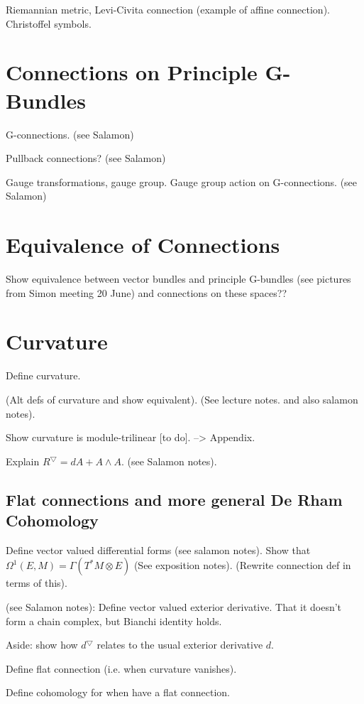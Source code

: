 \documentclass[a4paper]{article}
\theoremstyle{definition} \newtheorem*{definition}{Definition}
\theoremstyle{definition} \newtheorem*{definitions}{Definitions}
\theoremstyle{plain} \newtheorem{theorem}{Theorem}[section]
\theoremstyle{plain} \newtheorem{proposition}[theorem]{Proposition}
\theoremstyle{plain} \newtheorem{corollary}[theorem]{Corollary}
\theoremstyle{plain} \newtheorem{lemma}[theorem]{Lemma}
\theoremstyle{plain} \newtheorem{example}[theorem]{Example}
\begin{document}
Riemannian metric, Levi-Civita connection (example of affine connection). Christoffel symbols.

\section{Connections on Principle G-Bundles}

G-connections. (see Salamon)

Pullback connections? (see Salamon)

Gauge transformations, gauge group. Gauge group action on G-connections. (see Salamon)

\section{Equivalence of Connections}
Show equivalence between vector bundles and principle G-bundles (see pictures from Simon meeting 20 June)
and connections on these spaces??

\section{Curvature}

Define curvature. 

(Alt defs of curvature and show equivalent). (See  lecture notes. and also salamon notes).

Show curvature is module-trilinear [to do]. --> Appendix.

Explain $R^\bigtriangledown = dA + A\wedge A$. (see Salamon notes).

\subsection{Flat connections and more general De Rham Cohomology}

Define vector valued differential forms (see salamon notes). 
Show that $\Omega^1 (E, M) = \Gamma (T^*M\otimes E)$ (See exposition notes). 
(Rewrite connection def in terms of this).

(see Salamon notes):
Define vector valued exterior derivative. That it doesn't form a chain complex, but Bianchi identity holds. 

Aside: show how $d^\bigtriangledown$ relates to the usual exterior derivative $d$.

Define flat connection (i.e. when curvature vanishes).

Define cohomology for when have a flat connection.
\end{document}
